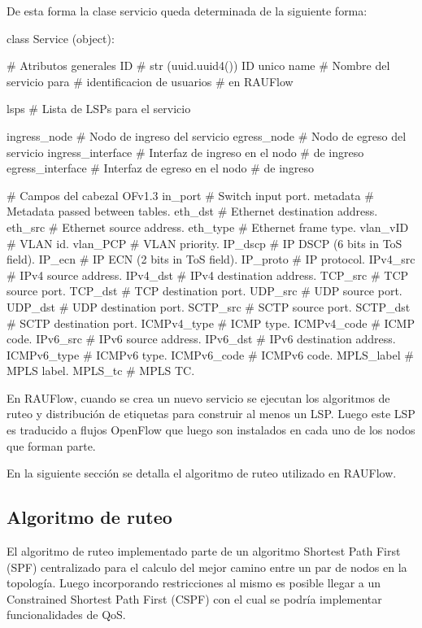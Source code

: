 \newpage
De esta forma la clase servicio queda determinada de la siguiente forma:\\

\begin{python}
class Service (object):

		# Atributos generales
		ID 				    # str (uuid.uuid4()) ID unico  
		name 				# Nombre del servicio para 
							# identificacion de usuarios 
							# en RAUFlow
							
		lsps				# Lista de LSPs para el servicio
		
		ingress_node		# Nodo de ingreso del servicio
		egress_node 		# Nodo de egreso del servicio			
		ingress_interface 	# Interfaz de ingreso en el nodo 
							# de ingreso		
		egress_interface 	# Interfaz de egreso en el nodo 
							# de ingreso 
        
		# Campos del cabezal OFv1.3 
		in_port			# Switch input port. 
		metadata 		# Metadata passed between tables. 
		eth_dst 		# Ethernet destination address.
		eth_src 		# Ethernet source address. 
		eth_type 		# Ethernet frame type. 
		vlan_vID 		# VLAN id. 
		vlan_PCP		# VLAN priority. 
		IP_dscp 		# IP DSCP (6 bits in ToS field). 
		IP_ecn  		# IP ECN (2 bits in ToS field). 
		IP_proto		# IP protocol. 
		IPv4_src 		# IPv4 source address. 
		IPv4_dst 		# IPv4 destination address. 
		TCP_src 		# TCP source port. 
		TCP_dst 		# TCP destination port. 
		UDP_src 		# UDP source port. 
		UDP_dst 		# UDP destination port. 
		SCTP_src 		# SCTP source port. 
		SCTP_dst 		# SCTP destination port. 
		ICMPv4_type 	# ICMP type. 
		ICMPv4_code 	# ICMP code. 
		IPv6_src 		# IPv6 source address. 
		IPv6_dst 		# IPv6 destination address. 
		ICMPv6_type 	# ICMPv6 type. 
		ICMPv6_code 	# ICMPv6 code. 
		MPLS_label 		# MPLS label. 
		MPLS_tc 		# MPLS TC. 
		
\end{python}

En RAUFlow, cuando se crea un nuevo servicio se ejecutan los algoritmos de ruteo y distribución de etiquetas para construir al menos un LSP. Luego este LSP es traducido a flujos OpenFlow que luego son instalados en cada uno de los nodos que forman parte. 

En la siguiente secci\'on se detalla el algoritmo de ruteo utilizado en RAUFlow.

\subsection{Algoritmo de ruteo}
El algoritmo de ruteo implementado parte de un algoritmo Shortest Path First (SPF) centralizado para el calculo del mejor camino entre un par de nodos en la topolog\'ia. Luego incorporando restricciones al mismo es posible llegar a un Constrained Shortest Path First (CSPF) con el cual se podr\'ia implementar funcionalidades de QoS.\\


